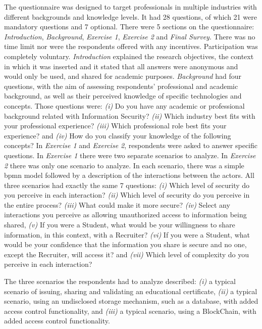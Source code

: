 The questionnaire was designed to target professionals in multiple industries with different backgrounds and knowledge levels. It had 28 questions, of which 21 were mandatory questions and 7 optional. There were 5 sections on the questionnaire: \textit{Introduction}, \textit{Background}, \textit{Exercise 1}, \textit{Exercise 2} and \textit{Final Survey}. There was no time limit nor were the respondents offered with any incentives. Participation was completely voluntary.
%
\textit{Introduction} explained the research objectives, the context in which it was inserted and it stated that all answers were anonymous and would only be used, and shared for academic purposes. 
%
\textit{Background} had four questions, with the aim of assessing respondents' professional and academic background, as well as their perceived knowledge of specific technologies and concepts. Those questions were:
%
\emph{(i)} Do you have any academic or professional background related with Information Security? 
\emph{(ii)} Which industry best fits with your professional experience? 
\emph{(iii)} Which professional role best fits your experience? 
and \emph{(iv)} How do you classify your knowledge of the following concepts?
%
In \textit{Exercise 1} and \textit{Exercise 2}, respondents were asked to answer specific questions. In \textit{Exercise 1} there were two separate scenarios to analyze. In \textit{Exercise 2} there was only one scenario to analyze. In each scenario, there was a simple \gls{bpmn} \cite{BPMN} model followed by a description of the interactions between the actors. All three scenarios had exactly the same 7 questions: 
%
\emph{(i)} Which level of security do you perceive in each interaction? 
\emph{(ii)} Which level of security do you perceive in the entire process? 
\emph{(iii)} What could make it more secure? 
\emph{(iv)} Select any interactions you perceive as allowing unauthorized access to information being shared, 
\emph{(v)} If you were a Student, what would be your willingness to share information, in this context, with a Recruiter? 
\emph{(vi)} If you were a Student, what would be your confidence that the information you share is secure and no one, except the Recruiter, will access it? 
and \emph{(vii)} Which level of complexity do you perceive in each interaction?

The three scenarios the respondents had to analyze described: 
\emph{(i)} a typical scenario of issuing, sharing and validating an educational certificate, \emph{(ii)} a typical scenario, using an undisclosed storage mechanism, such as a database, with added access control functionality, and \emph{(iii)} a typical scenario, using a BlockChain, with added access control functionality.


